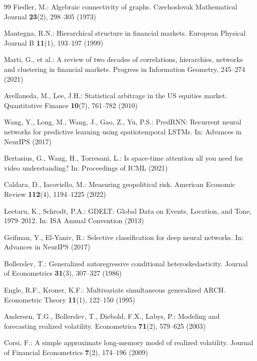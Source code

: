 \documentclass[runningheads]{llncs}
\begin{document}
\begin{thebibliography}{99}
Fiedler, M.: Algebraic connectivity of graphs. Czechoslovak Mathematical
Journal \textbf{23}(2), 298--305 (1973)

Mantegna, R.N.: Hierarchical structure in financial markets. European
Physical Journal B \textbf{11}(1), 193--197 (1999)

Marti, G., et al.: A review of two decades of correlations, hierarchies,
networks and clustering in financial markets. Progress in Information
Geometry, 245--274 (2021)

Avellaneda, M., Lee, J.H.: Statistical arbitrage in the US equities
market. Quantitative Finance \textbf{10}(7), 761--782 (2010)

Wang, Y., Long, M., Wang, J., Gao, Z., Yu, P.S.: PredRNN: Recurrent
neural networks for predictive learning using spatiotemporal LSTMs.
In: Advances in NeurIPS (2017)

Bertasius, G., Wang, H., Torresani, L.: Is space-time attention all you
need for video understanding? In: Proceedings of ICML (2021)

Caldara, D., Iacoviello, M.: Measuring geopolitical risk. American
Economic Review \textbf{112}(4), 1194--1225 (2022)

Leetaru, K., Schrodt, P.A.: GDELT: Global Data on Events, Location, and
Tone, 1979--2012. In: ISA Annual Convention (2013)

Geifman, Y., El-Yaniv, R.: Selective classification for deep neural
networks. In: Advances in NeurIPS (2017)

Bollerslev, T.: Generalized autoregressive conditional
heteroskedasticity. Journal of Econometrics \textbf{31}(3), 307--327
(1986)

Engle, R.F., Kroner, K.F.: Multivariate simultaneous generalized ARCH.
Econometric Theory \textbf{11}(1), 122--150 (1995)

Andersen, T.G., Bollerslev, T., Diebold, F.X., Labys, P.: Modeling and
forecasting realized volatility. Econometrica \textbf{71}(2), 579--625
(2003)

Corsi, F.: A simple approximate long-memory model of realized volatility.
Journal of Financial Econometrics \textbf{7}(2), 174--196 (2009)


\end{thebibliography}
\end{document}
